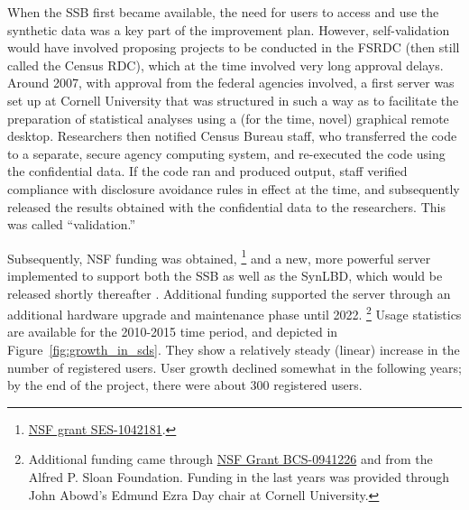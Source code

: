 \documentclass[12pt]{article}
\begin{document}

When the \ac{SSB} first became available, the need for users to access and use the synthetic data was a key part of the improvement plan. However, self-validation would have involved proposing projects to be conducted in the \ac{FSRDC} (then still called the Census RDC), which at the time involved very long approval delays.  Around 2007, with approval from the federal agencies involved, a first server was set up at Cornell University that was structured in such a way as to facilitate the preparation of statistical analyses using a (for the time, novel) graphical remote desktop.  Researchers then notified Census Bureau staff, who transferred the code to  a separate, secure agency computing system,   and re-executed the code using the confidential data. If the code ran and produced output, staff verified compliance with disclosure avoidance rules in effect at the time, and subsequently released the results obtained with the confidential data to the researchers. This was called ``validation.'' 

%
Subsequently, \ac{NSF} funding was obtained,%
%
\footnote{\href{https://www.nsf.gov/awardsearch/showAward?AWD_ID=1042181}{NSF grant SES-1042181}.}
%
and a new, more powerful server implemented to support both the \ac{SSB} as well as the \ac{SynLBD}, which would be released shortly thereafter \citep{KinneyEtAl2011}. Additional funding supported the server through an additional hardware upgrade and maintenance phase until 2022.%
%
\footnote{ Additional funding came through \href{https://www.nsf.gov/awardsearch/showAward?AWD_ID=0941226}{NSF Grant BCS-0941226} and from the Alfred P. Sloan Foundation. Funding in the last years was provided through John Abowd's Edmund Ezra Day chair at Cornell University.}
%
Usage statistics are available for the 2010-2015 time period, and depicted in Figure~\ref{fig:growth_in_sds}. They show a relatively steady (linear) increase in the number of registered users. User growth declined somewhat in the following years; by the end of the project, there were about 300 registered users.
\end{document}
